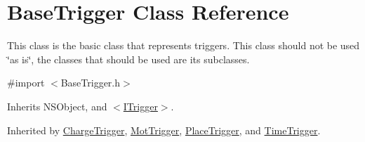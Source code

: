 \hypertarget{interface_base_trigger}{}\section{Base\+Trigger Class Reference}
\label{interface_base_trigger}


This class is the basic class that represents triggers. This class should not be used \char`\"{}as is\char`\"{}, the classes that should be used are it\textquotesingle{}s subclasses.  




{\ttfamily \#import $<$Base\+Trigger.\+h$>$}



Inherits N\+S\+Object, and \hyperlink{protocol_i_trigger-p}{$<$\+I\+Trigger$>$}.



Inherited by \hyperlink{interface_charge_trigger}{Charge\+Trigger}, \hyperlink{interface_mot_trigger}{Mot\+Trigger}, \hyperlink{interface_place_trigger}{Place\+Trigger}, and \hyperlink{interface_time_trigger}{Time\+Trigger}.

